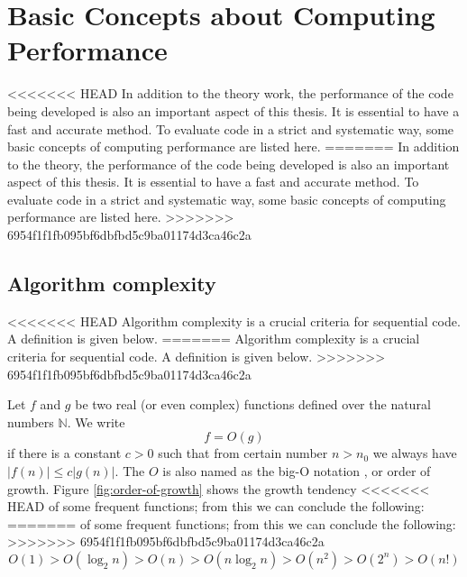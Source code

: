 
\chapter{Basic Concepts about Computing Performance\label{chpt:computing-performance}}

<<<<<<< HEAD
In addition to the theory work, the performance of the code being
developed is also an important aspect of this thesis. It is essential
to have a fast and accurate method. To evaluate code in a strict
and systematic way, some basic concepts of computing performance are
listed here. 
=======
In addition to the theory, the performance of the code being developed is
also an important aspect of this thesis. It is essential to
have a fast and accurate method. To evaluate code in a strict and
systematic way, some basic concepts of computing performance are listed
here. 
>>>>>>> 6954f1f1fb095bf6dbfbd5c9ba01174d3ca46c2a


\section{Algorithm complexity}

<<<<<<< HEAD
Algorithm complexity is a crucial criteria for sequential code. A
definition is given below.
=======
Algorithm complexity is a crucial criteria for sequential code.
A definition is given below.
>>>>>>> 6954f1f1fb095bf6dbfbd5c9ba01174d3ca46c2a

Let $f$ and $g$ be two real (or even complex) functions defined
over the natural numbers $\mathbb{N}$. We write
\begin{equation}
f=O(g)
\end{equation}
if there is a constant $c>0$ such that from certain number $n>n_{0}$
we always have $\left|f(n)\right|\leq c\left|g(n)\right|.$ The $O$
is also named as the big-O notation \citep{Complexity}, or order
of growth. Figure \ref{fig:order-of-growth} shows the growth tendency
<<<<<<< HEAD
of some frequent functions; from this we can conclude the following:
=======
of some frequent functions; from this we can conclude the following: 
>>>>>>> 6954f1f1fb095bf6dbfbd5c9ba01174d3ca46c2a
\begin{equation}
O(1)>O(\log_{2}n)>O(n)>O(n\log_{2}n)>O(n^{2})>O(2^{n})>O(n!)
\end{equation}


